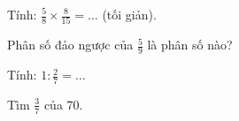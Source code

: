 \begin{ex}
Tính: $\frac{5}{8} \times \frac{8}{15} = \dots$ (tối giản).
\end{ex}

\begin{ex}
Phân số đảo ngược của $\frac{5}{9}$ là phân số nào?
\end{ex}

\begin{ex}
Tính: $1 : \frac{2}{7} = \dots$
\end{ex}

\begin{ex}
Tìm $\frac{3}{7}$ của 70.
\end{ex}

